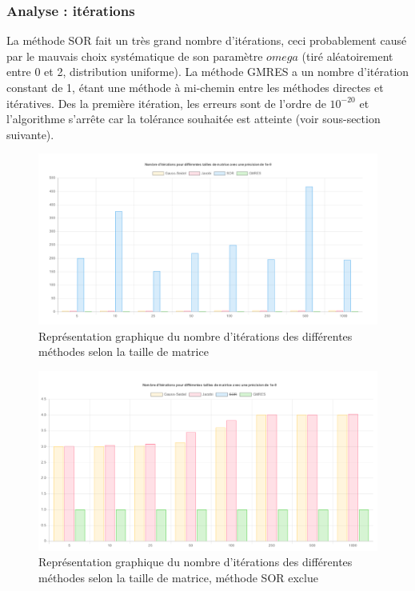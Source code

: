 \subsubsection{Analyse : itérations}
La méthode SOR fait un très grand nombre d'itérations, ceci probablement causé par le mauvais choix systématique de son paramètre $omega$ (tiré aléatoirement entre 0 et 2, distribution uniforme). La méthode GMRES a un nombre d'itération constant de 1, étant une méthode à mi-chemin entre les méthodes directes et itératives. Des la première itération, les erreurs sont de l'ordre de $10^{-20}$ et l'algorithme s'arrête car la tolérance souhaitée est atteinte (voir sous-section suivante).

\begin{figure}[H]
	\centering
	\includegraphics[width=0.8\linewidth]{images/nbIters.PNG}
	\caption{Représentation graphique du nombre d'itérations des différentes méthodes selon la taille de matrice}
\end{figure}

\begin{figure}[H]
	\centering
	\includegraphics[width=0.8\linewidth]{images/nbItersSansSOR.PNG}
	\caption{Représentation graphique du nombre d'itérations des différentes méthodes selon la taille de matrice, méthode SOR exclue}
\end{figure}



